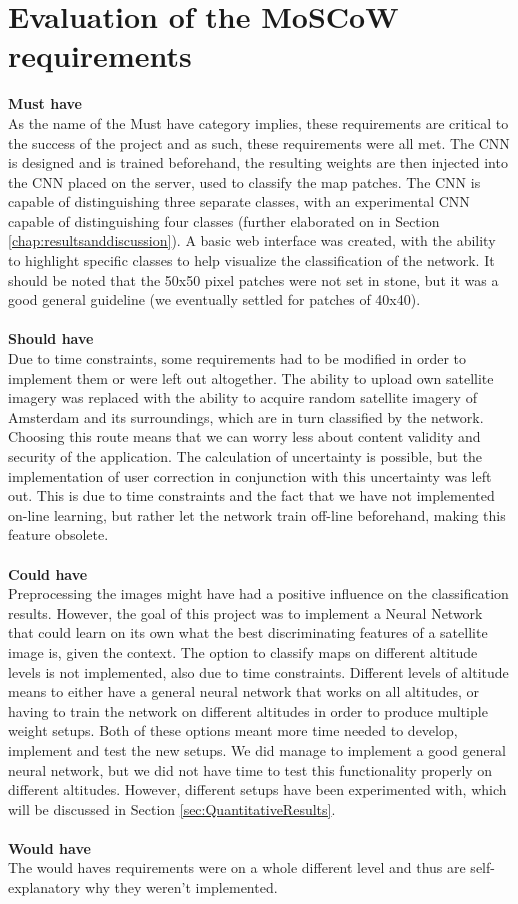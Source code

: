 \documentclass[a4paper,onecolumn]{report}
\begin{document}
\section{Evaluation of the MoSCoW requirements}
\label{sec:Evaluation MOSCOW}


\textbf{Must have}\\
As the name of the Must have category implies, these requirements are critical to the success of the project and as such, these requirements were all met. The CNN is designed and is trained beforehand, the resulting weights are then injected into the CNN placed on the server, used to classify the map patches. The CNN is capable of distinguishing three separate classes, with an experimental CNN capable of distinguishing four classes (further elaborated on in Section \ref{chap:resultsanddiscussion}).
A basic web interface was created, with the ability to highlight specific classes to help visualize the classification of the network. It should be noted that the 50x50 pixel patches were not set in stone, but it was a good general guideline (we eventually settled for patches of 40x40).\\
\\
\textbf{Should have}\\
Due to time constraints, some requirements had to be modified in order to implement them or were left out altogether. The ability to upload own satellite imagery was replaced with the ability to acquire random satellite imagery of Amsterdam and its surroundings, which are in turn classified by the network. Choosing this route means that we can worry less about content validity and security of the application. The calculation of uncertainty is possible, but the implementation of user correction in conjunction with this uncertainty was left out. This is due to time constraints and the fact that we have not implemented on-line learning, but rather let the network train off-line beforehand, making this feature obsolete.\\
\\
\textbf{Could have}\\
Preprocessing the images might have had a positive influence on the classification results. However, the goal of this project was to implement a Neural Network that could learn on its own what the best discriminating features of a satellite image is, given the context. The option to classify maps on different altitude levels is not implemented, also due to time constraints. Different levels of altitude means to either have a general neural network that works on all altitudes, or having to train the network on different altitudes in order to produce multiple weight setups. Both of these options meant more time needed to develop, implement and test the new setups. We did manage to implement a good general neural network, but we did not have time to test this functionality properly on different altitudes. However, different setups have been experimented with, which will be discussed in Section \ref{sec:QuantitativeResults}.\\
\\
\textbf{Would have}\\
The would haves requirements were on a whole different level and thus are self-explanatory why they weren't implemented.
\end{document}
